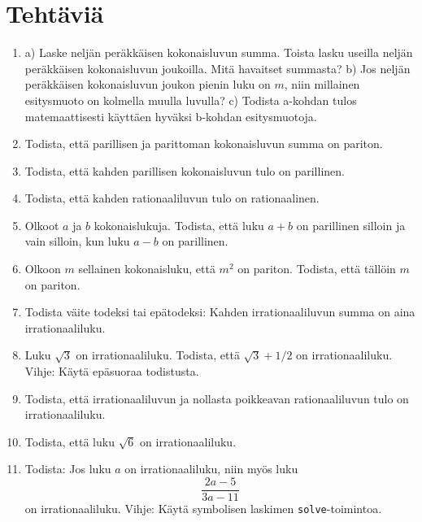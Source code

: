 \newpage




\section*{Tehtäviä}

\begin{enumerate}

\item a) Laske neljän peräkkäisen kokonaisluvun summa.
Toista lasku useilla neljän peräkkäisen kokonaisluvun
joukoilla. Mitä havaitset summasta?
b) Jos neljän peräkkäisen kokonaisluvun joukon pienin
luku on $m$, niin millainen esitysmuoto on kolmella
muulla luvulla?
c) Todista a-kohdan tulos matemaattisesti käyttäen
hyväksi b-kohdan esitysmuotoja.

\item Todista, että parillisen ja parittoman kokonaisluvun
summa on pariton.

\item Todista, että kahden parillisen kokonaisluvun tulo
on parillinen.

\item Todista, että kahden rationaaliluvun tulo on rationaalinen.

\item Olkoot $a$ ja $b$ kokonaislukuja. Todista, että luku
$a + b$ on parillinen silloin ja vain silloin, kun luku
$a - b$ on parillinen.

\item Olkoon $m$ sellainen kokonaisluku, että $m^2$ on
pariton. Todista, että tällöin $m$ on pariton.

\item Todista väite todeksi tai epätodeksi: Kahden
irrationaaliluvun summa on aina irrationaaliluku.

\item Luku $\sqrt{3}$ on irrationaaliluku. Todista,
että $\sqrt{3}+1/2$ on irrationaaliluku. Vihje: Käytä
epäsuoraa todistusta.

\item Todista, että irrationaaliluvun ja nollasta poikkeavan rationaaliluvun tulo on irrationaaliluku.

\item Todista, että luku $\sqrt{6}$ on irrationaaliluku.

\item Todista: Jos luku $a$ on irrationaaliluku, niin
myös luku
\[
\frac{2a-5}{3a-11}
\]
on irrationaaliluku. Vihje: Käytä symbolisen laskimen
{\tt solve}-toimintoa.


\end{enumerate}
